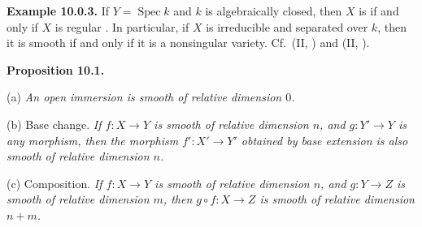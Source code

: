 {\medskip
\noindent\hypertarget{result-III-10.0.3}{}\textbf{Example 10.0.3.} If $Y=\operatorname{Spec}k$ and $k$ is algebraically closed, then $X$ is  if and only if $X$ is regular . In particular, if $X$ is irreducible and separated over $k$, then it is smooth if and only if it is a nonsingular variety. Cf.\ (II, ) and (II, ).

\medskip
\noindent\hypertarget{result-III-10.1}{}\textbf{Proposition 10.1.}

\noindent\hspace*{1.7em}\hypertarget{result-III-10.1-a}{}(a) \emph{An open immersion is smooth of relative dimension $0$.}

\noindent\hspace*{1.7em}\hypertarget{result-III-10.1-b}{}(b) Base change. \emph{If $f\colon X\to Y$ is smooth of relative dimension $n$, and $g\colon Y'\to Y$ is any morphism, then the morphism $f'\colon X'\to Y'$ obtained by base extension is also smooth of relative dimension $n$.}

\noindent\hspace*{1.7em}\hypertarget{result-III-10.1-c}{}(c) Composition. \emph{If $f\colon X\to Y$ is smooth of relative dimension $n$, and $g\colon Y\to Z$ is smooth of relative dimension $m$, then $g\circ f\colon X\to Z$ is smooth of relative dimension $n+m$.}}
